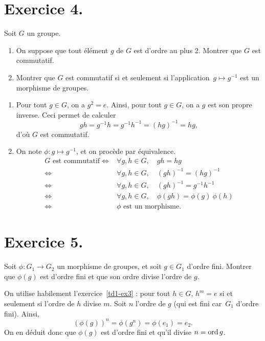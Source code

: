 \documentclass[./main]{subfiles}
\begin{document}
  \section{Exercice 4.}
  
  \begin{enonce}
    Soit $G$ un groupe.
    \begin{enumerate}
      \item On suppose que tout élément $g$ de $G$ est d'ordre au plus 2. Montrer que $G$ est commutatif.
      \item Montrer que $G$ est commutatif si et seulement si l'application~$g \mapsto g^{-1}$ est un morphisme de groupes.
    \end{enumerate}
  \end{enonce}

  \begin{enumerate}
    \item Pour tout $g \in G$, on a $g^2 = e$. 
      Ainsi, pour tout $g \in G$, on a $g$ est son propre inverse.
      Ceci permet de calculer \[
        gh = g^{-1} h = g^{-1}h^{-1} = (h g)^{-1} = h g
      ,\] 
      d'où $G$ est commutatif.
    \item On note $\phi : g \mapsto g^{-1}$, et on procède par équivalence.
      \begin{align*}
        G \text{ est commutatif} \iff& \forall g, h \in G, \quad gh = hg\\
        \iff& \forall g,h \in G, \quad(gh)^{-1} = (hg)^{-1}\\
        \iff& \forall g,h \in G, \quad(gh)^{-1} = g^{-1}h^{-1}\\
        \iff& \forall g,h \in G,\quad\phi(gh) = \phi(g)\:\phi(h)\\
        \iff& \phi \text{ est un morphisme}
      .\end{align*}
  \end{enumerate}

  \section{Exercice 5.}
  \begin{enonce}
    Soit $\phi : G_1 \to G_2$ un morphisme de groupes, et soit $g \in G_1$ d'ordre fini. Montrer que $\phi(g)$ est d'ordre fini et que son ordre divise l'ordre de  $g$.
  \end{enonce}

  On utilise habilement l'exercice~\ref{td1-ex3} : pour tout $h \in G$, $h^m = e$ si et seulement si l'ordre de $h$ divise $m$.
  Soit $n$ l'ordre de $g$ (qui est fini car~$G_1$ d'ordre fini).
  Ainsi, \[
    (\phi(g))^n = \phi(g^n) = \phi(e_1) = e_2
  .\]
  On en déduit donc que $\phi(g)$ est d'ordre fini et qu'il divise $n = \operatorname{ord} g$.
\end{document}
